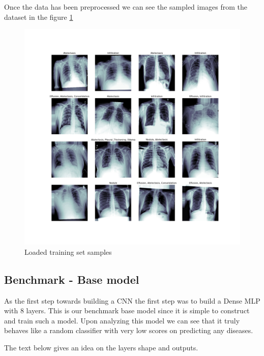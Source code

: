 \documentclass{article}
\begin{document}
    Once the data has been preprocessed we can see the sampled images from the dataset in the figure \ref{fig:sampled-xrays}

    \begin{figure}
        \includegraphics[width=\linewidth]{./images/sampled_loaded_training_set.jpg}
        \caption{Loaded training set samples}
        \label{fig:sampled-xrays}
    \end{figure}

    \subsection{Benchmark - Base model}
    
    As the first step towards building a CNN the first step was to build a Dense MLP with 8 layers. This is our benchmark base model since it is simple to construct and train such a model. Upon analyzing this model we can see that it truly behaves like a random classifier with very low scores on predicting any diseases.

    The text below gives an idea on the layers shape and outputs.
\end{document}
